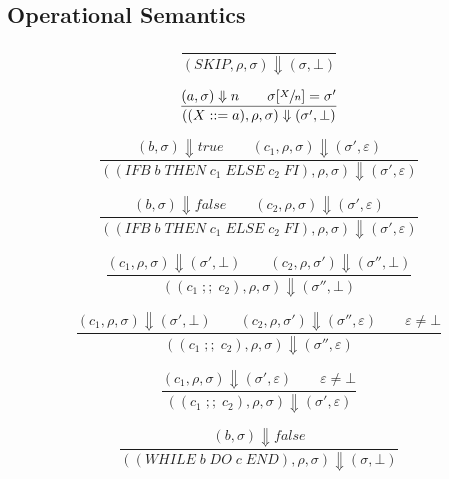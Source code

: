 \subsection{Operational Semantics}

\begin{equation}
\frac{}{(SKIP, \rho, \sigma) \Downarrow (\sigma, \bot)}
\end{equation}

\begin{equation}
\frac{(a, \sigma) \Downarrow n \qquad \sigma[\sfrac{X}{n}] = \sigma'}{((X ::= a), \rho, \sigma) \Downarrow (\sigma', \bot)}
\end{equation}

\begin{equation}
\frac{(b, \sigma) \Downarrow true \qquad (c_1, \rho, \sigma) \Downarrow (\sigma', \varepsilon)}{((IFB\; b\; THEN\; c_1\; ELSE\; c_2\; FI), \rho, \sigma) \Downarrow (\sigma', \varepsilon)}
\end{equation}

\begin{equation}
\frac{(b, \sigma) \Downarrow false \qquad (c_2, \rho, \sigma) \Downarrow (\sigma', \varepsilon)}{((IFB\; b\; THEN\; c_1\; ELSE\; c_2\; FI), \rho, \sigma) \Downarrow (\sigma', \varepsilon)}
\end{equation}

\begin{equation}
\frac{(c_1, \rho, \sigma) \Downarrow (\sigma', \bot) \qquad (c_2, \rho, \sigma') \Downarrow (\sigma'', \bot)}{((c_1\; ;;\; c_2), \rho, \sigma) \Downarrow (\sigma'', \bot)}
\end{equation}

\begin{equation}
\frac{(c_1, \rho, \sigma) \Downarrow (\sigma', \bot) \qquad (c_2, \rho, \sigma') \Downarrow (\sigma'', \varepsilon) \qquad \varepsilon \neq \bot}{((c_1\; ;;\; c_2), \rho, \sigma) \Downarrow (\sigma'', \varepsilon)}
\end{equation}

\begin{equation}
\frac{(c_1, \rho, \sigma) \Downarrow (\sigma', \varepsilon) \qquad \varepsilon \neq \bot}{((c_1\; ;;\; c_2), \rho, \sigma) \Downarrow (\sigma', \varepsilon)}
\end{equation}

\begin{equation}
\frac{(b, \sigma) \Downarrow false}{((WHILE\; b\; DO\; c\; END), \rho, \sigma) \Downarrow (\sigma, \bot)}
\end{equation}

